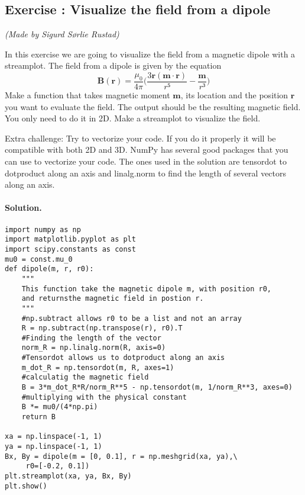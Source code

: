 \documentclass[%
oneside,                 %
final,                   %
10pt]{article}
\newenvironment{doconceexercise}{}{}
\newcounter{doconceexercisecounter}
\begin{document}

\newcommand{\exercisesection}[1]{\subsection*{#1}}





\begin{doconceexercise}

\exercisesection{Exercise \thedoconceexercisecounter: Visualize the field from a dipole}


\emph{(Made by Sigurd Sørlie Rustad)}

\noindent
In this exercise we are going to visualize the field from a magnetic dipole with a streamplot. The field from a dipole is given by the equation
\begin{equation}
\mathbf{B}(\mathbf{r}) = \frac{\mu_0}{4\pi}\bigg(\frac{3\mathbf{r}(\mathbf{m}\cdot\mathbf{r})}{r⁵}-\frac{\mathbf{m}}{r³}\bigg)
\end{equation}
Make a function that takes magnetic moment $\mathbf{m}$, its location and the position $\mathbf{r}$ you want to evaluate the field.
The output should be the resulting magnetic field. You only need to do it in 2D. Make a streamplot to visualize the field.

\noindent
Extra challenge: Try to vectorize your code. If you do it properly it will be compatible with both 2D and 3D. NumPy has several
good packages that you can use to vectorize your code. The ones used in the solution are tensordot to dotproduct along an axis
and linalg.norm to find the length of several vectors along an axis.


\paragraph{Solution.}
\begin{verbatim}
import numpy as np
import matplotlib.pyplot as plt
import scipy.constants as const
mu0 = const.mu_0
def dipole(m, r, r0):
    """
    This function take the magnetic dipole m, with position r0, 
    and returnsthe magnetic field in postion r.
    """
    #np.subtract allows r0 to be a list and not an array
    R = np.subtract(np.transpose(r), r0).T
    #Finding the length of the vector
    norm_R = np.linalg.norm(R, axis=0)
    #Tensordot allows us to dotproduct along an axis
    m_dot_R = np.tensordot(m, R, axes=1)
    #calculatig the magnetic field
    B = 3*m_dot_R*R/norm_R**5 - np.tensordot(m, 1/norm_R**3, axes=0)
    #multiplying with the physical constant
    B *= mu0/(4*np.pi)
    return B
    
xa = np.linspace(-1, 1)
ya = np.linspace(-1, 1)
Bx, By = dipole(m = [0, 0.1], r = np.meshgrid(xa, ya),\
     r0=[-0.2, 0.1])
plt.streamplot(xa, ya, Bx, By)
plt.show()
\end{verbatim}


\end{doconceexercise}



\end{document}
